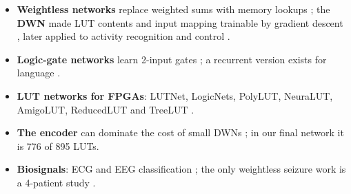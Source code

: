 \begin{itemize}
\item \textbf{Weightless networks} replace weighted sums with memory lookups \cite{aleksander1984wisard,susskind2022bthowen,susskind2023uleen};
  the \textbf{DWN} made LUT contents and input mapping trainable by gradient descent \cite{bacellar2024dwn}, later applied to
  activity recognition and control \cite{bacellar2025nanoml,kresse2025dwc}.
\item \textbf{Logic-gate networks} learn 2-input gates \cite{petersen2022dlgn,petersen2024convdlgn,ruttgers2026lightdlgn};
  a recurrent version exists for language \cite{buhrer2025rdlgn}.
\item \textbf{LUT networks for FPGAs}: LUTNet, LogicNets, PolyLUT, NeuraLUT, AmigoLUT, ReducedLUT and TreeLUT
  \cite{wang2019lutnet,umuroglu2020logicnets,andronic2023polylut,andronic2024neuralut,weng2025amigolut,cassidy2025reducedlut,khataei2025treelut}.
\item \textbf{The encoder} can dominate the cost of small DWNs \cite{mecik2025thermo}; in our final network it is 776 of
  895 LUTs.
\item \textbf{Biosignals}: ECG \cite{mommen2026ecg} and EEG classification \cite{dharia2026eeglgn}; the only weightless
  seizure work is a 4-patient study \cite{deaguiar2015wisard}.
\end{itemize}

